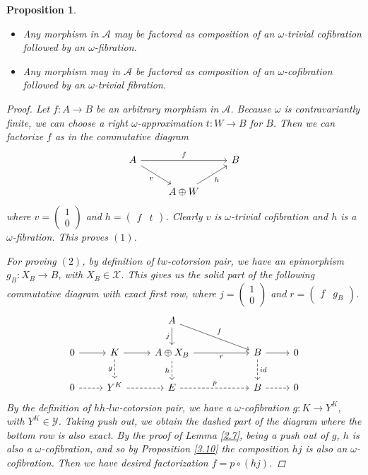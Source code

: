 \documentclass[12pt]{amsart}
\numberwithin{equation}{section}
\newtheorem{proposition}[lemma]{Proposition}
\theoremstyle{definition}
\newtheorem*{theorem 0*}{Theorem}
\newtheorem*{theorem a*}{Theorem A}
\newtheorem*{theorem b*}{Theorem B}
\newcounter{diagram}
\numberwithin{diagram}{section}
\begin{document}
\begin{proposition}\label{3.12}
\begin{itemize}
\item[(1)]
Any morphism in $\mathcal{A}$ may be factored as composition of an $\omega$-trivial cofibration followed by an $\omega$-fibration.
\item[(2)]
Any morphism may in $\mathcal{A}$ be factored as composition of an $\omega$-cofibration followed by an $\omega$-trivial fibration.
\end{itemize}
\begin{proof}
Let $f:A\rightarrow B$ be an arbitrary morphism in $\mathcal{A}$. Because $\omega$ is contravariantly finite, we can choose a right $\omega$-approximation $t:W\rightarrow B$ for $B$. Then we can factorize $f$ as in the commutative diagram
\[\begin{tikzcd}
	A && B \\
	& {A\oplus W}
	\arrow["f", from=1-1, to=1-3]
	\arrow["v"', from=1-1, to=2-2]
	\arrow["h"', from=2-2, to=1-3]
\end{tikzcd}\]
where $v=\begin{pmatrix}
1\\0
\end{pmatrix}$ and $h=\begin{pmatrix}
f&t
\end{pmatrix}$. Clearly $v$ is $\omega$-trivial cofibration and $h$ is a $\omega$-fibration. This proves $(1)$.

For proving $(2)$, by definition of $lw$-cotorsion pair, we have an epimorphism $g_B:X_B\rightarrow B$, with $X_B\in\mathcal{X}$. This gives us the solid part of the following commutative diagram with exact first row, where $j=\begin{pmatrix}
1\\0
\end{pmatrix}$ and $r=\begin{pmatrix}
f&g_B
\end{pmatrix}$.
\[\begin{tikzcd}
	&& A &&& \\
	0 & K & {A\oplus X_B} & {} & B & 0 \\
	0 & {Y^K} & E && B & 0
	\arrow["j"', from=1-3, to=2-3]
	\arrow["f", from=1-3, to=2-5]
	\arrow[from=2-1, to=2-2]
	\arrow[from=2-2, to=2-3]
	\arrow["g"', dashed, from=2-2, to=3-2]
	\arrow["r"', from=2-3, to=2-5]
	\arrow["h"', dashed, from=2-3, to=3-3]
	\arrow[from=2-5, to=2-6]
	\arrow["id", dashed, from=2-5, to=3-5]
	\arrow[dashed, from=3-1, to=3-2]
	\arrow[dashed, from=3-2, to=3-3]
	\arrow["p", dashed, from=3-3, to=3-5]
	\arrow[dashed, from=3-5, to=3-6]
\end{tikzcd}\]
By the definition of $hh$-$lw$-cotorsion pair, we have a $\omega$-cofibration $g:K\rightarrow Y^K$, with $Y^K\in\mathcal{Y}$.
Taking push out, we obtain the dashed part of the diagram where the bottom row is also exact.
By the proof of Lemma \ref{2.7}, being a push out of $g$, $h$ is also a $\omega$-cofibration, and so by Proposition \ref{3.10} the composition $hj$ is also an $\omega$-cofibration. Then we have desired factorization $f=p\circ (hj)$.
\end{proof}
\end{proposition}
\end{document}

